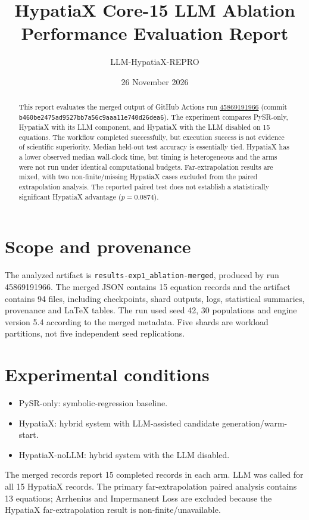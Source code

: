 \documentclass[11pt,a4paper]{article}
\title{HypatiaX Core-15 LLM Ablation\\Performance Evaluation Report}
\author{LLM-HypatiaX-REPRO}
\date{26 November 2026}
\begin{document}
\maketitle
\begin{abstract}
This report evaluates the merged output of GitHub Actions run
\href{https://github.com/sednabcn/LLM-HypatiaX-REPRO/actions/runs/45869191966}{45869191966}
(commit \texttt{b460be2475ad9527bb7a56c9aaa11e740d26dea6}).
The experiment compares PySR-only, HypatiaX with its LLM component, and
HypatiaX with the LLM disabled on 15 equations. The workflow completed
successfully, but execution success is not evidence of scientific superiority.
Median held-out test accuracy is essentially tied. HypatiaX has a lower
observed median wall-clock time, but timing is heterogeneous and the arms
were not run under identical computational budgets. Far-extrapolation
results are mixed, with two non-finite/missing HypatiaX cases excluded from
the paired extrapolation analysis. The reported paired test does not establish
a statistically significant HypatiaX advantage ($p=0.0874$).
\end{abstract}
\section{Scope and provenance}
The analyzed artifact is \texttt{results-exp1\_ablation-merged}, produced by
run 45869191966. The merged JSON contains 15 equation records and the
artifact contains 94 files, including checkpoints, shard outputs, logs,
statistical summaries, provenance and LaTeX tables. The run used seed 42,
30 populations and engine version 5.4 according to the merged metadata.
Five shards are workload partitions, not five independent seed replications.
\section{Experimental conditions}
\begin{itemize}[leftmargin=*]
\item PySR-only: symbolic-regression baseline.
\item HypatiaX: hybrid system with LLM-assisted candidate generation/warm-start.
\item HypatiaX-noLLM: hybrid system with the LLM disabled.
\end{itemize}
The merged records report 15 completed records in each arm. LLM was called
for all 15 HypatiaX records. The primary far-extrapolation paired analysis
contains 13 equations; Arrhenius and Impermanent Loss are excluded because
the HypatiaX far-extrapolation result is non-finite/unavailable.
\end{document}
